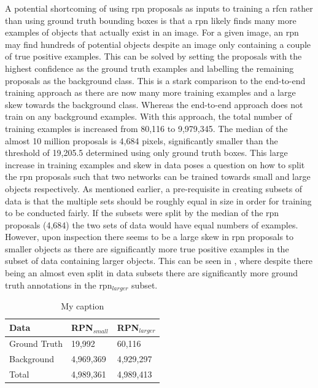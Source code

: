 A potential shortcoming of using \gls{rpn} proposals as inputs to training a \gls{rfcn} rather than using ground truth bounding boxes is that a \gls{rpn} likely finds many more examples of objects that actually exist in an image. For a given image, an \gls{rpn} may find hundreds of potential objects despite an image only containing a couple of true positive examples. This can be solved by setting the proposals with the highest confidence as the ground truth examples and labelling the remaining proposals as the background class. This is a stark comparison to the end-to-end training approach as there are now many more training examples and a large skew towards the background class. Whereas the end-to-end approach does not train on any background examples. With this approach, the total number of training examples is increased from 80,116 to 9,979,345. The median of the almost 10 million proposals is 4,684 pixels, significantly smaller than the threshold of 19,205.5 determined using only ground truth boxes. This large increase in training examples and skew in data poses a question on how to split the \gls{rpn} proposals such that two networks can be trained towards small and large objects respectively. As mentioned earlier, a pre-requisite in creating subsets of data is that the multiple sets should be roughly equal in size in order for training to be conducted fairly. If the subsets were split by the median of the \gls{rpn} proposals (4,684) the two sets of data would have equal numbers of examples. However, upon inspection there seems to be a large skew in \gls{rpn} proposals to smaller objects as there are significantly more true positive examples in the subset of data containing larger objects. This can be seen in , where despite there being an almost even split in data subsets there are significantly more ground truth annotations in the \gls{rpn}$_{larger}$ subset.

\begin{table}[h]
\centering
\caption{My caption}
\label{tab:splitrpn}
\begin{tabular}{|l|l|l|}
\hline
\textbf{Data} & \textbf{RPN$_{small}$} & \textbf{RPN$_{larger}$} \\ \hline
Ground Truth & 19,992    & 60,116     \\ 
Background   & 4,969,369 & 4,929,297  \\ \hline
Total        & 4,989,361 & 4,989,413  \\ \hline
\end{tabular}
\end{table}


